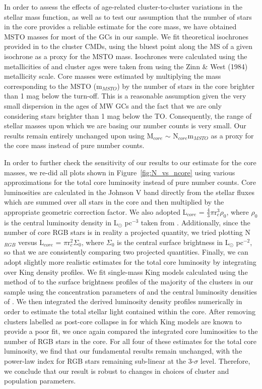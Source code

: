 In order to assess the effects of age-related cluster-to-cluster
variations in the stellar mass function, as well as to test our
assumption that the number of stars in the core provides a reliable
estimate for the core mass, we have obtained MSTO 
masses for most of the GCs in our sample.  We fit theoretical
isochrones provided in \citet{pols98} to the cluster CMDs, using
the bluest point along the MS of a given isochrone as a proxy for the
MSTO mass.  Isochrones were calculated
using the metallicities of \citet{piotto02} and cluster ages were
taken from \citet{deangeli05} using the Zinn \& West (1984)
metallicity scale.  Core masses were estimated by multiplying the mass
corresponding to the MSTO (m$_{MSTO}$) by the number of stars in the
core brighter than 1 mag below the turn-off.  This is a reasonable
assumption given the very small dispersion in the ages of MW
GCs \citep{deangeli05} and the fact that we are only considering stars
brighter than 1 mag below the TO.  Consequently, the range of stellar
masses upon which we are basing our 
number counts is very small.  Our results remain entirely unchanged
upon using M$_{core}$ $\sim$ N$_{core}$m$_{MSTO}$ as a proxy for the
core mass instead of pure number counts.

In order to further check the sensitivity of our results to our estimate for
the core masses, we re-did all plots shown in
Figure~\ref{fig:N_vs_ncore} using various approximations for the total core
luminosity instead of pure number counts.  Core luminosities are
calculated in the Johnson V band directly from the stellar fluxes
which are summed over all stars in the core and then multiplied by the
appropriate geometric correction factor.  We also adopted L$_{core}$ =
$\frac{4}{3}\pi$r$_c^3$$\rho_0$, where $\rho_0$ is the
central luminosity density in L$_{\odot}$ pc$^{-3}$ taken from
\citet{harris96}.  Additionally, since the number of core RGB stars is
in reality a projected quantity, we tried plotting N$_{RGB}$ versus
L$_{core}$ = $\pi$r$_c^2$$\Sigma_0$, where 
$\Sigma_0$ is the central surface brightness in L$_{\odot}$ 
pc$^{-2}$, so that we are consistently comparing two projected
quantities.  Finally, we can adopt slightly more realistic
estimates for the total core luminosity by integrating over King
density profiles.  We fit single-mass King models calculated using the
method of \citet{sigurdsson95} to the surface brightness profiles of the
majority of the clusters in our sample using the concentration
parameters of \citet{mclaughlin05} and the central luminosity
densities of \citet{harris96}.  We then integrated the derived
luminosity density profiles numerically in order to estimate the total
stellar light contained within the core.  After removing clusters
labelled as post-core collapse in \citet{harris96} for which King
models are known to provide a poor fit, we once again compared the
integrated core luminosities to the number of RGB stars in the core.
For all four of these estimates for the total core luminosity, we
find that our fundamental results remain unchanged, with the power-law
index for RGB stars remaining sub-linear at the 3-$\sigma$ level.
Therefore, we conclude that our result is robust to changes in choices
of cluster and population parameters.  

